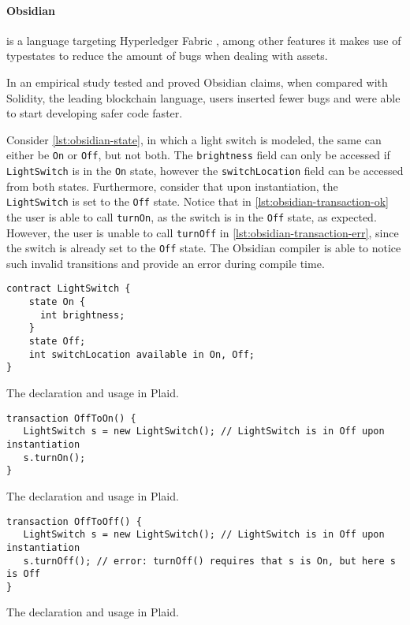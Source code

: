 \paragraph{Obsidian} is a language targeting Hyperledger Fabric \autocite{Fabric2021},
among other features it makes use of typestates to reduce the amount of bugs when dealing with assets.

In \autocite{Coblenz2020} an empirical study tested and proved Obsidian claims,
when compared with Solidity, the leading blockchain language,
users inserted fewer bugs and were able to start developing safer code faster.

Consider \autoref{lst:obsidian-state}, in which a light switch is modeled,
the same can either be \texttt{On} or \texttt{Off}, but not both.
The \texttt{brightness} field can only be accessed if \texttt{LightSwitch} is in the \texttt{On} state,
however the \texttt{switchLocation} field can be accessed from both states.
Furthermore, consider that upon instantiation, the \texttt{LightSwitch} is set to the \texttt{Off} state.
Notice that in \autoref{lst:obsidian-transaction-ok} the user is able to call \texttt{turnOn},
as the switch is in the \texttt{Off} state, as expected.
However, the user is unable to call \texttt{turnOff} in \autoref{lst:obsidian-transaction-err},
since the switch is already set to the \texttt{Off} state.
The Obsidian compiler is able to notice such invalid transitions and provide an error during compile time.

\begin{listing}
    \centering
    \begin{verbatim}
contract LightSwitch {
    state On {
      int brightness;
    }
    state Off;
    int switchLocation available in On, Off;
}
    \end{verbatim}
    \caption{The  declaration and usage in Plaid.}
    \label{lst:obsidian-state}
\end{listing}

\begin{listing}
    \centering
    \begin{verbatim}
transaction OffToOn() {
   LightSwitch s = new LightSwitch(); // LightSwitch is in Off upon instantiation
   s.turnOn();
}
    \end{verbatim}
    \caption{The  declaration and usage in Plaid.}
    \label{lst:obsidian-transaction-ok}
\end{listing}

\begin{listing}
    \centering
    \begin{verbatim}
transaction OffToOff() {
   LightSwitch s = new LightSwitch(); // LightSwitch is in Off upon instantiation
   s.turnOff(); // error: turnOff() requires that s is On, but here s is Off
}
    \end{verbatim}
    \caption{The  declaration and usage in Plaid.}
    \label{lst:obsidian-transaction-err}
\end{listing}

